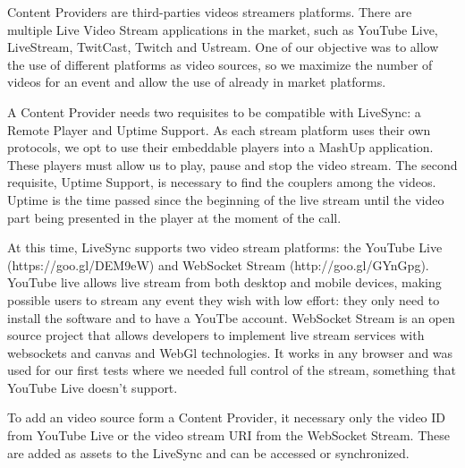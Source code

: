 Content Providers are third-parties videos streamers platforms. There are multiple Live Video Stream applications in the market, such as YouTube Live, LiveStream, TwitCast, Twitch and Ustream. One of our objective was to allow the use of different platforms as video sources, so we maximize the number of videos for an event and allow the use of already in market platforms. 

A Content Provider needs two requisites to be compatible with LiveSync: a Remote Player and Uptime Support. As each stream platform uses their own protocols, we opt to use their embeddable players into a MashUp application. These players must allow us to play, pause and stop the video stream. The second requisite, Uptime Support, is necessary to find the couplers among the videos. Uptime is the time passed since the beginning of the live stream until the video part being presented in the player at the moment of the call.

At this time, LiveSync supports two video stream platforms: the YouTube Live (https://goo.gl/DEM9eW) and WebSocket Stream (http://goo.gl/GYnGpg). YouTube live allows live stream from both desktop and mobile devices, making possible users to stream any event they wish with low effort: they only need to install the software and to have a YouTbe account. WebSocket Stream is an open source project that allows developers to implement live stream services with websockets and canvas and WebGl technologies. It works in any browser and was used for our first tests where we needed full control of the stream, something that YouTube Live doesn't support.

To add an video source form a Content Provider, it necessary only the video ID from YouTube Live or the video stream URI from the WebSocket Stream. These are added as assets to the LiveSync and can be accessed or synchronized.




